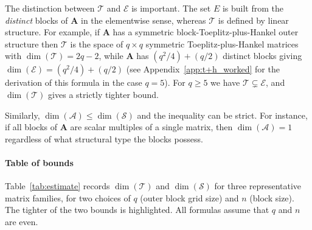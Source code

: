 \documentclass{siamart251216}
\def\bA{\mathbf{A}}
\begin{document}
\begin{remark}
\label{rem:E_vs_T}
The distinction between $\mathscr{T}$ and $\mathscr{E}$ is important.  The set $E$ is built from
the \emph{distinct} blocks of $\bA$ in the elementwise sense, whereas $\mathscr{T}$ is defined
by linear structure.  For example, if $\bA$ has a symmetric block-Toeplitz-plus-Hankel outer
structure then $\mathscr{T}$ is the space of $q\times q$ symmetric Toeplitz-plus-Hankel matrices
with $\dim(\mathscr{T})=2q-2$, while $\bA$ has $(q^2/4)+(q/2)$ distinct blocks giving
$\dim(\mathscr{E})=(q^2/4)+(q/2)$ (see Appendix~\ref{app:t+h_worked} for the derivation of
this formula in the case $q=5$).  For $q\ge 5$ we have $\mathscr{T}\subsetneq\mathscr{E}$, and
$\dim(\mathscr{T})$ gives a strictly tighter bound.
\end{remark}

\begin{remark}
\label{rem:A_vs_S}
Similarly, $\dim(\mathscr{A})\le\dim(\mathscr{S})$ and the inequality can be strict.  For
instance, if all blocks of $\bA$ are scalar multiples of a single matrix, then
$\dim(\mathscr{A})=1$ regardless of what structural type the blocks possess.
\end{remark}

\paragraph{Table of bounds}
Table~\ref{tab:estimate} records $\dim(\mathscr{T})$ and $\dim(\mathscr{S})$ for three
representative matrix families, for two choices of $q$ (outer block grid size) and $n$ (block
size).  The tighter of the two bounds is highlighted.  All formulas assume that $q$ and $n$ are even.
\end{document}
